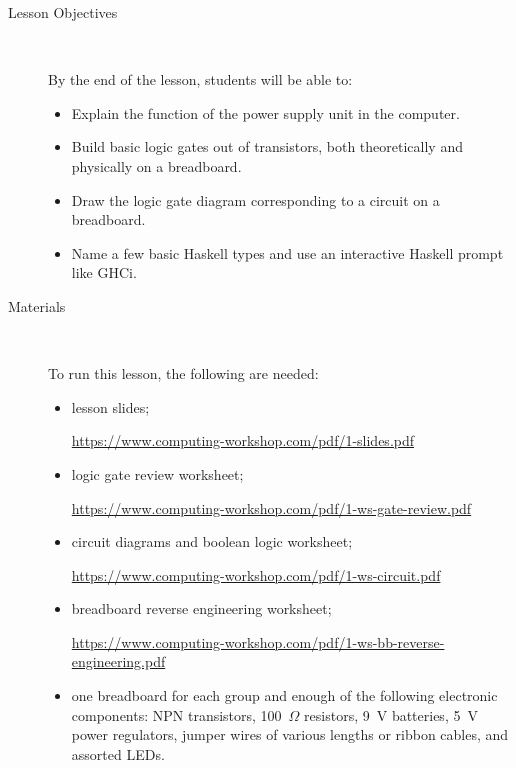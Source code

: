 \documentclass[11pt]{article}
\newcommand{\cwurl}{https://www.computing-workshop.com/}
\newcommand{\cwpdf}{\cwurl pdf/}
\begin{document}
\begin{description}
  \item[Lesson Objectives] ~

   By the end of the lesson, students will be able to:

  \begin{itemize}
    \item Explain the function of the power supply unit in the computer.

    \item Build basic logic gates out of transistors, both theoretically and
      physically on a breadboard.

    \item Draw the logic gate diagram corresponding to a circuit on a
      breadboard.

    \item Name a few basic Haskell types and use an interactive Haskell prompt
      like GHCi.
  \end{itemize}

  \item [Materials]~

    To run this lesson, the following are needed:

    \begin{itemize}
      \item
        lesson slides;

        \url{\cwpdf 1-slides.pdf}

      \item
        logic gate review worksheet;

        \url{\cwpdf 1-ws-gate-review.pdf}

      \item
        circuit diagrams and boolean logic worksheet;

        \url{\cwpdf 1-ws-circuit.pdf}

      \item
        breadboard reverse engineering worksheet;

        \url{\cwpdf 1-ws-bb-reverse-engineering.pdf}

      \item
        one breadboard for each group and enough of the following electronic
        components:
        NPN transistors,
        100~$\Omega$ resistors,
        9~V batteries,
        5~V power regulators,
        jumper wires of various lengths or ribbon cables,
        and assorted LEDs.

    \end{itemize}
\end{description}
\end{document}
